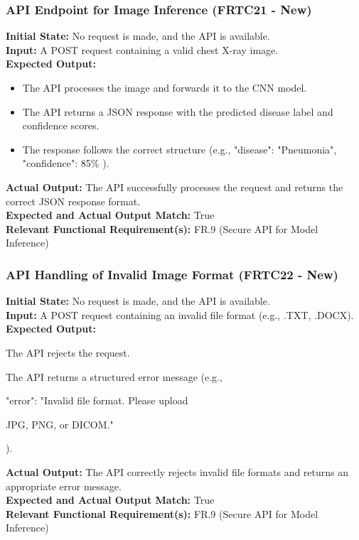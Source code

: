 \documentclass[12pt, titlepage]{article}
\begin{document}
\subsubsection{API Endpoint for Image Inference (FRTC21 - New)}
\textbf{Initial State:} No request is made, and the API is available.\\
\textbf{Input:} A POST request containing a valid chest X-ray image.\\
\textbf{Expected Output:}
\begin{itemize}
\item The API processes the image and forwards it to the CNN model.
\item The API returns a JSON response with the predicted disease label and confidence scores.
\item The response follows the correct structure (e.g., { "disease": "Pneumonia", "confidence": 85\% }).
\end{itemize}
\textbf{Actual Output:} The API successfully processes the request and returns the correct JSON response format.\\
\textbf{Expected and Actual Output Match:} True\\
\textbf{Relevant Functional Requirement(s):} FR.9 (Secure API for Model Inference)\\

\subsubsection{API Handling of Invalid Image Format (FRTC22 - New)}
\textbf{Initial State:} No request is made, and the API is available.\\
\textbf{Input:} A POST request containing an invalid file format (e.g., .TXT, .DOCX).\\
\textbf{Expected Output:}
\begin{itemize}
\item The API rejects the request.
\item The API returns a structured error message (e.g., { "error": "Invalid file format. Please upload \item JPG, PNG, or DICOM." }).
\end{itemize}
\textbf{Actual Output:} The API correctly rejects invalid file formats and returns an appropriate error message.\\
\textbf{Expected and Actual Output Match:} True\\
\textbf{Relevant Functional Requirement(s):} FR.9 (Secure API for Model Inference)\\
\end{document}
